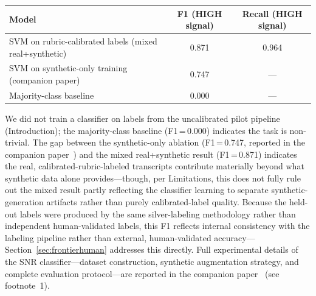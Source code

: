 \documentclass[11pt]{article}
\begin{document}
\begin{center}
\small
\begin{tabular}{lcc}
\toprule
\textbf{Model} & \textbf{F1 (HIGH signal)} & \textbf{Recall (HIGH signal)} \\
\midrule
SVM on rubric-calibrated labels (mixed real+synthetic) & 0.871 & 0.964 \\
SVM on synthetic-only training (companion paper) & 0.747 & ---   \\
Majority-class baseline  & 0.000 & ---   \\
\bottomrule
\end{tabular}
\end{center}

We did not train a classifier on labels from the uncalibrated pilot
pipeline (Introduction); the majority-class baseline (F1\,=\,0.000)
indicates the task is non-trivial. The gap between the synthetic-only
ablation (F1\,=\,0.747, reported in the companion paper~\cite{dasSNR2026})
and the mixed real+synthetic result (F1\,=\,0.871) indicates the real,
calibrated-rubric-labeled transcripts contribute materially beyond what
synthetic data alone provides---though, per Limitations, this does not
fully rule out the mixed result partly reflecting the classifier learning
to separate synthetic-generation artifacts rather than purely calibrated-label
quality. Because the held-out labels were produced by the same
silver-labeling methodology rather than independent human-validated labels,
this F1 reflects internal consistency with the labeling pipeline rather
than external, human-validated accuracy---Section~\ref{sec:frontierhuman}
addresses this directly. Full experimental details of the SNR
classifier---dataset construction, synthetic augmentation strategy, and
complete evaluation protocol---are reported in the companion
paper~\cite{dasSNR2026} (see footnote~1).
\end{document}
